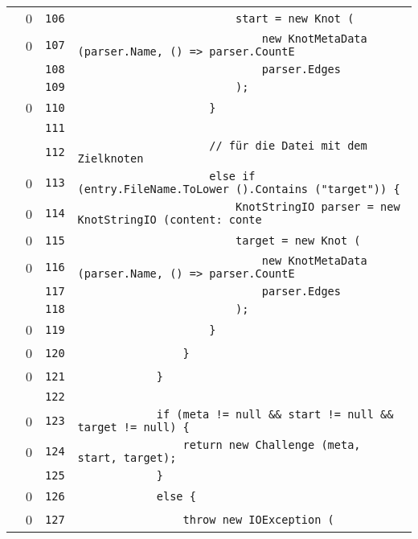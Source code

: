 \documentclass[a4paper,10pt]{article}
\begin{document}
\begin{longtable}[l]{lrrl}
\cellcolor{red} & 0 & \verb~106~ & \verb~                        start = new Knot (~\\
\cellcolor{red} & 0 & \verb~107~ & \verb~                            new KnotMetaData (parser.Name, () => parser.CountE~\\
\cellcolor{gray} &  & \verb~108~ & \verb~                            parser.Edges~\\
\cellcolor{gray} &  & \verb~109~ & \verb~                        );~\\
\cellcolor{red} & 0 & \verb~110~ & \verb~                    }~\\
\cellcolor{gray} &  & \verb~111~ & \verb~~\\
\cellcolor{gray} &  & \verb~112~ & \verb~                    // für die Datei mit dem Zielknoten~\\
\cellcolor{red} & 0 & \verb~113~ & \verb~                    else if (entry.FileName.ToLower ().Contains ("target")) {~\\
\cellcolor{red} & 0 & \verb~114~ & \verb~                        KnotStringIO parser = new KnotStringIO (content: conte~\\
\cellcolor{red} & 0 & \verb~115~ & \verb~                        target = new Knot (~\\
\cellcolor{red} & 0 & \verb~116~ & \verb~                            new KnotMetaData (parser.Name, () => parser.CountE~\\
\cellcolor{gray} &  & \verb~117~ & \verb~                            parser.Edges~\\
\cellcolor{gray} &  & \verb~118~ & \verb~                        );~\\
\cellcolor{red} & 0 & \verb~119~ & \verb~                    }~\\
\cellcolor{red} & 0 & \verb~120~ & \verb~                }~\\
\cellcolor{red} & 0 & \verb~121~ & \verb~            }~\\
\cellcolor{gray} &  & \verb~122~ & \verb~~\\
\cellcolor{red} & 0 & \verb~123~ & \verb~            if (meta != null && start != null && target != null) {~\\
\cellcolor{red} & 0 & \verb~124~ & \verb~                return new Challenge (meta, start, target);~\\
\cellcolor{gray} &  & \verb~125~ & \verb~            }~\\
\cellcolor{red} & 0 & \verb~126~ & \verb~            else {~\\
\cellcolor{red} & 0 & \verb~127~ & \verb~                throw new IOException (~\\

\end{longtable}
\end{document}
